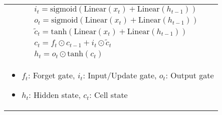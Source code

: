 \documentclass{article}
\begin{document}
\begin{summary}
\begin{center}
\begin{tabular}{llll}
            & & & $i_t = \text{sigmoid}(\text{Linear}(x_t) + \text{Linear}(h_{t-1}))$ \\
            & & & $o_t = \text{sigmoid}(\text{Linear}(x_t) + \text{Linear}(h_{t-1}))$ \\
            & & & $\tilde{c}_t = \text{tanh}(\text{Linear}(x_t) + \text{Linear}(h_{t-1}))$ \\
            & & & $c_t = f_t \odot c_{t-1} + i_t \odot \tilde{c}_t$ \\
            & & & $h_t = o_t \odot \text{tanh}(c_t)$ \\
            \multicolumn{4}{p{\linewidth}}{
            \begin{itemize}
                \item $f_t$: Forget gate, $i_t$: Input/Update gate, $o_t$: Output gate
                \item $h_t$: Hidden state, $c_t$: Cell state
            \end{itemize}} \\
            \bottomrule
        \end{tabular}
    \end{center}
\end{summary}
\end{document}
